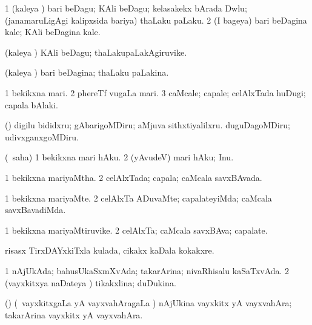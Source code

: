 \bentry
{}
\gl{\nA}
\bmng
\bnum
\num{1} (kaleya \vi) bari beDagu; KAli beDagu; kelasakekx bArada Dwlu; (janamaruLigAgi kalipxsida bariya) thaLaku paLaku. 
\num{2} (I bageya) bari beDagina kale; KAli beDagina kale. 
\enum
\emng
\eentry

\bentry
{}
\gl{\nA}
\bmng
(kaleya \vi) KAli beDagu; thaLakupaLakAgiruvike. 
\emng
\eentry

\bentry
{}
\gl{\gu}
\bmng
(kaleya \vi) bari beDagina; thaLaku paLakina. 
\emng
\eentry

\bentry
{}
\gl{\nA}
\bmng
\bnum
\num{1} bekikxna mari. 
\num{2} phereTf \mo vugaLa mari. 
\num{3} caMcale; capale; celAlxTada huDugi; capala bAlaki. 
\enum
\emng

\noindent
\gl{\nuga}
\bmng
{} (\AmA) 
\banum
{} digilu bididxru; gAbarigoMDiru; aMjuva sithxtiyalilxru. 
 duguDagoMDiru; udivxganxgoMDiru. 
\eanum
\emng
\eentry

\bentry
{}
\gl{\sakirx}
\bmng
(\akirx\ saha) 
\bnum
\num{1} bekikxna mari hAku. 
\num{2} (yAvudeV) mari hAku; Inu. 
\enum
\emng
\eentry

\bentry
{}
\gl{\gu}
\bmng
\bnum
\num{1} bekikxna mariyaMtha. 
\num{2} celAlxTada; capala; caMcala savxBAvada. 
\enum
\emng
\eentry

\bentry
{}
\gl{\kirxvi}
\bmng
\bnum
\num{1} bekikxna mariyaMte. 
\num{2} celAlxTa ADuvaMte; capalateyiMda; caMcala savxBavadiMda. 
\enum
\emng
\eentry

\bentry
{}
\gl{\nA}
\bmng
\bnum
\num{1} bekikxna mariyaMtiruvike. 
\num{2} celAlxTa; caMcala savxBAva; capalate. 
\enum
\emng
\eentry

\bentry
{}
\gl{\nA}
\bmng
risasx TirxDAYxkiTxla kulada, cikakx kaDala kokakxre. 
\emng
\eentry

\bentry
{}
\gl{\gu}
\bmng
\bnum
\num{1} nAjUkAda; bahusUkaSxmXvAda; takarArina; nivaRhisalu kaSaTxvAda. 
\num{2} (vayxkitxya naDateya \vi) tikakxlina; duDukina. 
\enum
\emng
\eentry

\bentry
{}
\gl{\nA}
\bmng
(\rUpa) (\sA\ vayxkitxgaLa yA vayxvahAragaLa \vi) nAjUkina vayxkitx yA vayxvahAra; takarArina vayxkitx yA vayxvahAra. 
\emng
\eentry

